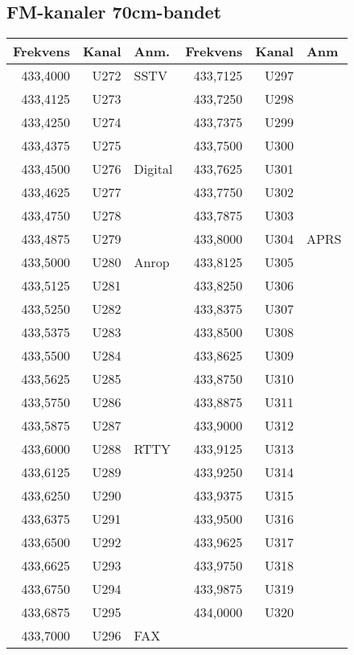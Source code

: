 \clearpage
\subsection{FM-kanaler 70cm-bandet}

\begin{longtable}{rrl|rrl}
	Frekvens & Kanal & Anm.    & Frekvens & Kanal & Anm  \\ \hline
	433,4000 &  U272 & SSTV    & 433,7125 &  U297 &  \\
	433,4125 &  U273 &         & 433,7250 &  U298 &  \\
	433,4250 &  U274 &         & 433,7375 &  U299 &  \\
	433,4375 &  U275 &         & 433,7500 &  U300 &  \\
	433,4500 &  U276 & Digital & 433,7625 &  U301 &  \\
	433,4625 &  U277 &         & 433,7750 &  U302 &  \\
	433,4750 &  U278 &         & 433,7875 &  U303 &  \\
	433,4875 &  U279 &         & 433,8000 &  U304 & APRS \\
	433,5000 &  U280 & Anrop   & 433,8125 &  U305 &  \\
	433,5125 &  U281 &         & 433,8250 &  U306 &  \\
	433,5250 &  U282 &         & 433,8375 &  U307 &  \\
	433,5375 &  U283 &         & 433,8500 &  U308 &  \\
	433,5500 &  U284 &         & 433,8625 &  U309 &  \\
	433,5625 &  U285 &         & 433,8750 &  U310 &  \\
	433,5750 &  U286 &         & 433,8875 &  U311 &  \\
	433,5875 &  U287 &         & 433,9000 &  U312 &  \\
	433,6000 &  U288 & RTTY    & 433,9125 &  U313 &  \\
	433,6125 &  U289 &         & 433,9250 &  U314 &  \\
	433,6250 &  U290 &         & 433,9375 &  U315 &  \\
	433,6375 &  U291 &         & 433,9500 &  U316 &  \\
	433,6500 &  U292 &         & 433,9625 &  U317 &  \\
	433,6625 &  U293 &         & 433,9750 &  U318 &  \\
	433,6750 &  U294 &         & 433,9875 &  U319 &  \\
	433,6875 &  U295 &         & 434,0000 &  U320 &  \\
	433,7000 &  U296 & FAX     &          &       &
\end{longtable}

